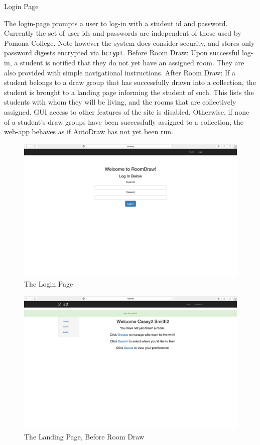 \begin{outline}
\1 Login Page

  \2 The login-page prompts a user to log-in with a student id and password.
  Currently the set of user ids and passwords are independent of those used by
  Pomona College. Note however the system does consider security, and stores
  only password digests encrypted via \texttt{bcrypt}.
  \2 Before Room Draw:
    \3 Upon successful log-in, a student is notified that they do not yet have
    an assigned room. They are also provided with simple navigational
    instructions.
  \2 After Room Draw:
    \3 If a student belongs to a draw group that has successfully drawn into a
    collection, the student is brought to a landing page informing the student
    of such. This lists the students with whom they will be living, and the
    rooms that are collectively assigned. GUI access to other features of the
    site is disabled.
    \3 Otherwise, if none of a student's draw groups have been successfully
    assigned to a collection, the web-app behaves as if AutoDraw has not yet
    been run.

\begin{figure}[H] \centering
\includegraphics[scale=.225]{screens/login}
\caption{The Login Page}
\label{fig:screenlogin}
\end{figure}

\begin{figure}[H] \centering
\includegraphics[scale=.225]{screens/landing_undrawn}
\caption{The Landing Page, Before Room Draw}
\label{fig:screenlandingundrawn}
\end{figure}


\end{outline}
